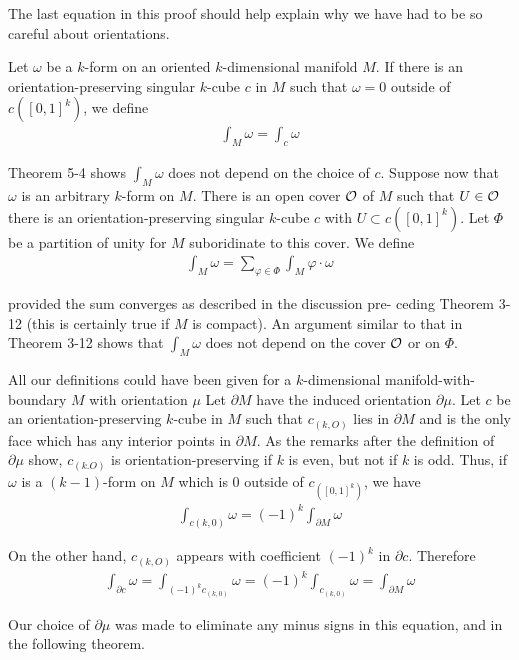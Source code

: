 The last equation in this proof should help explain why we
have had to be so careful about orientations.

Let $\omega$ be a $k$-form on an oriented $k$-dimensional manifold $M$.
If there is an orientation-preserving singular $k$-cube $c$ in $M$ such
that $\omega=0$ outside of $c([0, 1]^k)$, we define
\begin{align*}
    \int_M\omega=\int_c\omega
\end{align*}

Theorem 5-4 shows $\int_M \omega$ does not depend on the choice of $c$. Suppose 
now that $\omega$ is an arbitrary $k$-form on $M$. There is an open cover $\mathcal{O}$
of $M$ such that $U\in \mathcal{O}$ there is an orientation-preserving singular $k$-cube 
$c$ with $U\subset c([0,1]^k)$. Let $\Phi$ be a partition of unity for $M$ suboridinate 
to this cover. We define 
\begin{align*}
    \int_M\omega=\sum_{\varphi\in\Phi}\int_M\varphi\cdot\omega 
\end{align*} 

provided the sum converges as described in the discussion pre-
ceding Theorem 3-12 (this is certainly true if $M$ is compact).
An argument similar to that in Theorem 3-12 shows that $\int_M \omega$
does not depend on the cover $\mathcal{O}$ or on $\Phi$.

All our definitions could have been given for a $k$-dimensional manifold-with-boundary $M$ 
with orientation $\mu$ Let $\partial M$ have the induced orientation $\partial\mu$.
Let $c$ be an orientation-preserving $k$-cube in $M$ such that $c_{(k,O)}$ lies in $\partial M$ and 
is the only face which has any interior points in $\partial M$. As the remarks after
the definition of $\partial\mu$ show, $c_{(k.O)}$ is orientation-preserving if $k$ is
even, but not if $k$ is odd. Thus, if $\omega$ is a $(k-1)$-form on $M$ which is 0 outside 
of $c_{([0,1]^k)}$, we have
\begin{align*}
    \int_{c(k,0)}\omega = (-1)^k\int_{\partial M}\omega
\end{align*}

On the other hand, $c_{(k,O)}$ appears with coefficient $(-1)^k$ in $\partial c$.
Therefore
\begin{align*}
    \int_{\partial c}\omega 
    = \int_{(-1)^{k}c_{(k,0)}}\omega
    = (-1)^{k} \int_{c_{(k,0)}}\omega
    = \int_{\partial M}\omega
\end{align*}

Our choice of $\partial \mu$ was made to eliminate any minus signs in this equation, and 
in the following theorem.

